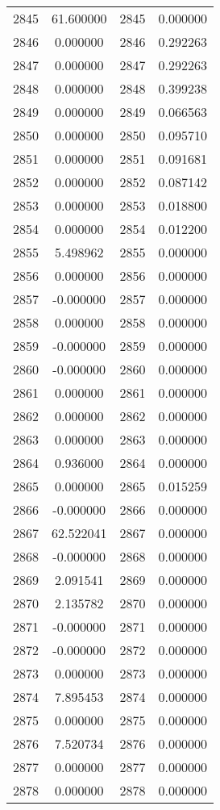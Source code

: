 \documentclass[12pt]{article}
\begin{document}
\begin{longtable}{@{}cccc@{}}
2845 & 61.600000 & 2845 & 0.000000 \\
2846 & 0.000000 & 2846 & 0.292263 \\
2847 & 0.000000 & 2847 & 0.292263 \\
2848 & 0.000000 & 2848 & 0.399238 \\
2849 & 0.000000 & 2849 & 0.066563 \\
2850 & 0.000000 & 2850 & 0.095710 \\
2851 & 0.000000 & 2851 & 0.091681 \\
2852 & 0.000000 & 2852 & 0.087142 \\
2853 & 0.000000 & 2853 & 0.018800 \\
2854 & 0.000000 & 2854 & 0.012200 \\
2855 & 5.498962 & 2855 & 0.000000 \\
2856 & 0.000000 & 2856 & 0.000000 \\
2857 & -0.000000 & 2857 & 0.000000 \\
2858 & 0.000000 & 2858 & 0.000000 \\
2859 & -0.000000 & 2859 & 0.000000 \\
2860 & -0.000000 & 2860 & 0.000000 \\
2861 & 0.000000 & 2861 & 0.000000 \\
2862 & 0.000000 & 2862 & 0.000000 \\
2863 & 0.000000 & 2863 & 0.000000 \\
2864 & 0.936000 & 2864 & 0.000000 \\
2865 & 0.000000 & 2865 & 0.015259 \\
2866 & -0.000000 & 2866 & 0.000000 \\
2867 & 62.522041 & 2867 & 0.000000 \\
2868 & -0.000000 & 2868 & 0.000000 \\
2869 & 2.091541 & 2869 & 0.000000 \\
2870 & 2.135782 & 2870 & 0.000000 \\
2871 & -0.000000 & 2871 & 0.000000 \\
2872 & -0.000000 & 2872 & 0.000000 \\
2873 & 0.000000 & 2873 & 0.000000 \\
2874 & 7.895453 & 2874 & 0.000000 \\
2875 & 0.000000 & 2875 & 0.000000 \\
2876 & 7.520734 & 2876 & 0.000000 \\
2877 & 0.000000 & 2877 & 0.000000 \\
2878 & 0.000000 & 2878 & 0.000000 \\

\end{longtable}
\end{document}
